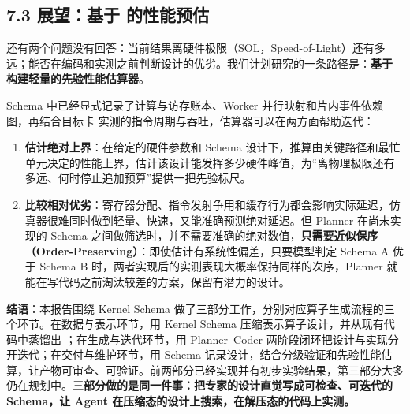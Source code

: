 \subsection{7.3 展望：基于  的性能预估}
还有两个问题没有回答：当前结果离硬件极限（SOL，Speed-of-Light）还有多远；能否在编码和实测之前判断设计的优劣。我们计划研究的一条路径是：\textbf{基于}  \textbf{构建轻量的先验性能估算器}。


\begin{DiagramBlock}
\end{DiagramBlock}
Schema 中已经显式记录了计算与访存账本、Worker 并行映射和片内事件依赖图，再结合目标卡  实测的指令周期与吞吐，估算器可以在两方面帮助迭代：


\begin{enumerate}[start=1]
\item
\textbf{估计绝对上界}：在给定的硬件参数和 Schema 设计下，推算由关键路径和最忙单元决定的性能上界，估计该设计能发挥多少硬件峰值，为“离物理极限还有多远、何时停止追加预算”提供一把先验标尺。


\item
\textbf{比较相对优劣}：寄存器分配、指令发射争用和缓存行为都会影响实际延迟，仿真器很难同时做到轻量、快速，又能准确预测绝对延迟。但 Planner 在尚未实现的 Schema 之间做筛选时，并不需要准确的绝对数值，\textbf{只需要近似保序（Order-Preserving）}：即使估计有系统性偏差，只要模型判定 Schema A 优于 Schema B 时，两者实现后的实测表现大概率保持同样的次序，Planner 就能在写代码之前淘汰较差的方案，保留有潜力的设计。


\end{enumerate}

\SourceSeparator
\begin{ReportQuote}
\textbf{结语}：本报告围绕 Kernel Schema 做了三部分工作，分别对应算子生成流程的三个环节。在数据与表示环节，用 Kernel Schema 压缩表示算子设计，并从现有代码中蒸馏出 ；在生成与迭代环节，用 Planner–Coder 两阶段闭环把设计与实现分开迭代；在交付与维护环节，用 Schema 记录设计，结合分级验证和先验性能估算，让产物可审查、可验证。前两部分已经实现并有初步实验结果，第三部分大多仍在规划中。\textbf{三部分做的是同一件事：把专家的设计直觉写成可检查、可迭代的 Schema，让 Agent 在压缩态的设计上搜索，在解压态的代码上实测。}


\end{ReportQuote}

